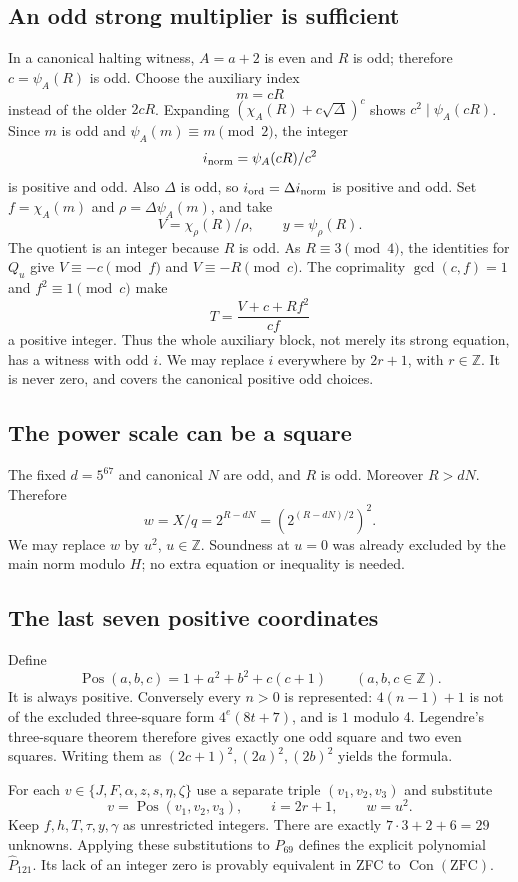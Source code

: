 \documentclass[11pt,a4paper]{article}
\theoremstyle{remark}\newtheorem{remark}[theorem]{Remark}
\newcommand{\Z}{\mathbb Z}
\newcommand{\Con}{\operatorname{Con}}
\newcommand{\Positive}{\operatorname{Pos}}
\begin{document}
\subsection{An odd strong multiplier is sufficient}
In a canonical halting witness, $A=a+2$ is even and $R$ is odd;
therefore $c=\psi_A(R)$ is odd. Choose the auxiliary index
\[
 m=cR
\]
instead of the older $2cR$. Expanding
$(\chi_A(R)+c\sqrt\Delta)^c$ shows $c^2\mid\psi_A(cR)$.
Since $m$ is odd and $\psi_A(m)\equiv m\pmod2$, the integer
\[
 i_{\rm norm}=\psi_A(cR)/c^2
\]
is positive and odd. Also $\Delta$ is odd, so
$i_{\rm ord}=\Delta i_{\rm norm}$ is positive and odd.
Set $f=\chi_A(m)$ and $\rho=\Delta\psi_A(m)$, and take
\[
 V=\chi_\rho(R)/\rho,\qquad y=\psi_\rho(R).
\]
The quotient is an integer because $R$ is odd. As $R\equiv3\pmod4$,
the identities for $Q_u$ give
$V\equiv-c\pmod f$ and $V\equiv-R\pmod c$.
The coprimality $\gcd(c,f)=1$ and $f^2\equiv1\pmod c$ make
\[
 T=\frac{V+c+Rf^2}{cf}
\]
a positive integer. Thus the whole auxiliary block, not merely its
strong equation, has a witness with odd $i$.
We may replace $i$ everywhere by $2r+1$, with $r\in\Z$.
It is never zero, and covers the canonical positive odd choices.

\subsection{The power scale can be a square}
The fixed $d=5^{67}$ and canonical $N$ are odd, and $R$ is odd.
Moreover $R>dN$. Therefore
\[
 w=X/q=2^{R-dN}
   =\left(2^{(R-dN)/2}\right)^2.
\]
We may replace $w$ by $u^2$, $u\in\Z$. Soundness at $u=0$
was already excluded by the main norm modulo $H$; no extra equation
or inequality is needed.

\subsection{The last seven positive coordinates}
Define
\[
 \Positive(a,b,c)=1+a^2+b^2+c(c+1)\qquad(a,b,c\in\Z).
\]
It is always positive. Conversely every $n>0$ is represented:
$4(n-1)+1$ is not of the excluded three-square form
$4^e(8t+7)$, and is $1$ modulo 4. Legendre's three-square theorem
therefore gives exactly one odd square and two even squares. Writing
them as $(2c+1)^2,(2a)^2,(2b)^2$ yields the formula.

For each $v\in\{J,F,\alpha,z,s,\eta,\zeta\}$ use a separate
triple $(v_1,v_2,v_3)$ and substitute
\begin{equation}
 v=\Positive(v_1,v_2,v_3),\qquad i=2r+1,\qquad w=u^2.
 \label{eq:integer-substitution}
\end{equation}
Keep $f,h,T,\tau,y,\gamma$ as unrestricted integers.
There are exactly $7\cdot3+2+6=29$ unknowns.
Applying these substitutions to $P_{69}$ defines the explicit
polynomial $\widehat P_{121}$. Its lack of an integer zero is
provably equivalent in ZFC to $\Con(\mathrm{ZFC})$.
\end{document}
